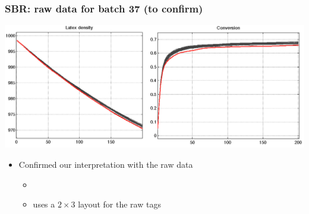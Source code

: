 \begin{frame}\frametitle{SBR: raw data for batch 37 (to confirm)}
	
	\begin{center}
		\includegraphics[width=\textwidth]{images/sbr/SBR-raw-data-batch-37-highlighted.png}
	\end{center}
	
	\begin{itemize}
		\item	Confirmed our interpretation with the raw data
				
				\begin{itemize}
					\item	{}
					
					\item	uses a \( 2 \times 3 \) layout for the raw tags
				\end{itemize}
	\end{itemize}
\end{frame}

